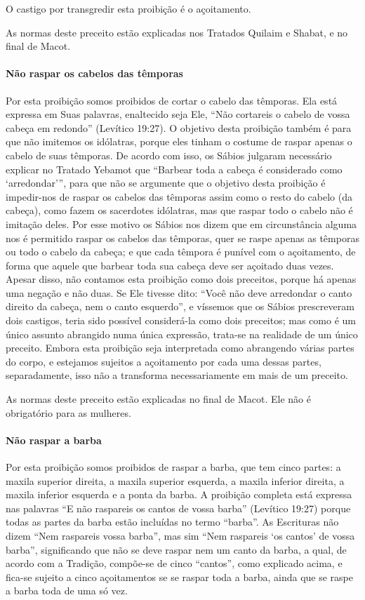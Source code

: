 O castigo por transgredir esta proibição é o açoitamento.

As normas deste preceito estão explicadas nos Tratados Quilaim e Shabat,
e no final de Macot.

\paragraph{Não raspar os cabelos das têmporas}

Por esta proibição somos proibidos de cortar o cabelo das têmporas. Ela
está expressa em Suas palavras, enaltecido seja Ele, ``Não cortareis o
cabelo de vossa cabeça em redondo'' (Levítico 19:27). O objetivo desta
proibição também é para que não imitemos os idólatras, porque eles
tinham o costume de raspar apenas o cabelo de suas têmporas. De acordo
com isso, os Sábios julgaram necessário explicar no Tratado Yebamot que
``Barbear toda a cabeça é considerado como `arredondar''', para que não
se argumente que o objetivo desta proibição é impedir-nos de raspar os
cabelos das têmporas assim como o resto do cabelo (da cabeça), como
fazem os sacerdotes idólatras, mas que raspar todo o cabelo não é
imitação deles. Por esse motivo os Sábios nos dizem que em circunstância
alguma nos é permitido raspar os cabelos das têmporas, quer se raspe
apenas as têmporas ou todo o cabelo da cabeça; e que cada têmpora é
punível com o açoitamento, de forma que aquele que barbear toda sua
cabeça deve ser açoitado duas vezes. Apesar disso, não contamos esta
proibição como dois preceitos, porque há apenas uma negação e não duas.
Se Ele tivesse dito: ``Você não deve arredondar o canto direito da
cabeça, nem o canto esquerdo'', e víssemos que os Sábios prescreveram
dois castigos, teria sido possível considerá-la como dois preceitos; mas
como é um único assunto abrangido numa única expressão, trata-se na
realidade de um único preceito. Embora esta proibição seja interpretada
como abrangendo várias partes do corpo, e estejamos sujeitos a
açoitamento por cada uma dessas partes, separadamente, isso não a
transforma necessariamente em mais de um preceito.

As normas deste preceito estão explicadas no final de Macot. Ele não é
obrigatório para as mulheres.

\paragraph{Não raspar a barba}

Por esta proibição somos proibidos de raspar a barba, que tem cinco
partes: a maxila superior direita, a maxila superior esquerda, a maxila
inferior direita, a maxila inferior esquerda e a ponta da barba. A
proibição completa está expressa nas palavras ``E não raspareis os
cantos de vossa barba'' (Levítico 19:27) porque todas as partes da
barba estão incluídas no termo ``barba''. As Escrituras não dizem ``Nem
raspareis vossa barba'', mas sim ``Nem raspareis `os cantos' de vossa
barba'', significando que não se deve raspar nem um canto da barba, a
qual, de acordo com a Tradição, compõe-se de cinco ``cantos'', como
explicado acima, e fica-se sujeito a cinco açoitamentos se se raspar
toda a barba, ainda que se raspe a barba toda de uma só vez.

